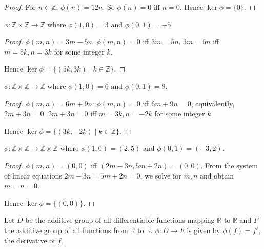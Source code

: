\begin{proof}
    For $n\in\mathbb{Z}$, $\phi(n) = 12n$. So $\phi(n) = 0$ iff $n = 0$. Hence $\ker\phi = \{ 0 \}$.
\end{proof}

\begin{exercise}
    $\phi: \mathbb{Z}\times\mathbb{Z} \to \mathbb{Z}$ where $\phi(1,0) = 3$ and $\phi(0,1) = -5$.
\end{exercise}

\begin{proof}
    $\phi(m, n) = 3m - 5n$. $\phi(m, n) = 0$ iff $3m = 5n$. $3m = 5n$ iff $m = 5k, n = 3k$ for some integer $k$.

    Hence $\ker\phi = \{ (5k, 3k) \mid k\in\mathbb{Z} \}$.
\end{proof}

\begin{exercise}
    $\phi: \mathbb{Z}\times\mathbb{Z} \to \mathbb{Z}$ where $\phi(1,0) = 6$ and $\phi(0,1) = 9$.
\end{exercise}

\begin{proof}
    $\phi(m, n) = 6m + 9n$. $\phi(m, n) = 0$ iff $6m + 9n = 0$, equivalently, $2m + 3n = 0$. $2m + 3n = 0$ iff $m = 3k, n = -2k$ for some integer $k$.

    Hence $\ker\phi = \{ (3k, -2k) \mid k\in\mathbb{Z} \}$.
\end{proof}

\begin{exercise}
    $\phi: \mathbb{Z}\times\mathbb{Z} \to \mathbb{Z}\times\mathbb{Z}$ where $\phi(1,0) = (2,5)$ and $\phi(0,1) = (-3,2)$.
\end{exercise}

\begin{proof}
    $\phi(m, n) = (0, 0)$ iff $(2m - 3n, 5m + 2n) = (0, 0)$. From the system of linear equations $2m - 3n = 5m + 2n = 0$, we solve for $m, n$ and obtain $m = n = 0$.

    Hence $\ker\phi = \{ (0,0) \}$.
\end{proof}

\begin{exercise}
    Let $D$ be the additive group of all differentiable functions mapping $\mathbb{R}$ to $\mathbb{R}$ and $F$ the additive group of all functions from $\mathbb{R}$ to $\mathbb{R}$. $\phi: D \to F$ is given by $\phi(f) = f'$, the derivative of $f$.
\end{exercise}

